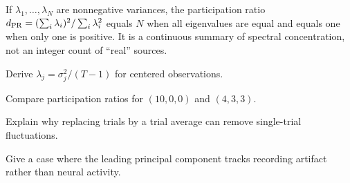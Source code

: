 \begin{workedexample}
If $\lambda_1,\ldots,\lambda_N$ are nonnegative variances, the participation ratio $d_{\rm PR}=(\sum_i\lambda_i)^2/\sum_i\lambda_i^2$ equals $N$ when all eigenvalues are equal and equals one when only one is positive. It is a continuous summary of spectral concentration, not an integer count of ``real'' sources.\end{workedexample}
\begin{exercises}
\item Derive $\lambda_j=\sigma_j^2/(T-1)$ for centered observations.
\item Compare participation ratios for $(10,0,0)$ and $(4,3,3)$.
\item Explain why replacing trials by a trial average can remove single-trial fluctuations.
\item Give a case where the leading principal component tracks recording artifact rather than neural activity.
\end{exercises}